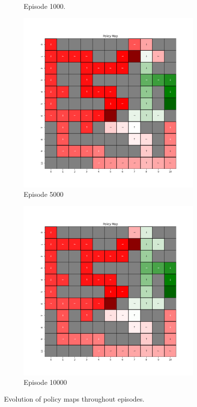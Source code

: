 \documentclass{assignment}
\begin{document}
\begin{figure}[H]
\begin{subfigure}{0.3\textwidth}
    \caption{Episode 1000.}
    \end{subfigure}\hfill
    \begin{subfigure}{0.3\textwidth}
        \includegraphics[width=\textwidth]{figures/policy_q/epsilon_sweep/policy_alpha_0.1_gamma_0.95_epsilon_1.0_iteration_5000.png}
    \caption{Episode 5000}
    \end{subfigure}\hfill
    \begin{subfigure}{0.3\textwidth}
        \includegraphics[width=\textwidth]{figures/policy_q/epsilon_sweep/policy_alpha_0.1_gamma_0.95_epsilon_1.0_iteration_10000.png}
    \caption{Episode 10000}
    \end{subfigure}
    \caption{Evolution of policy maps throughout episodes.}
    \label{fig:epsilon_1.0_q_learning_policy}
\end{figure}
\end{document}
